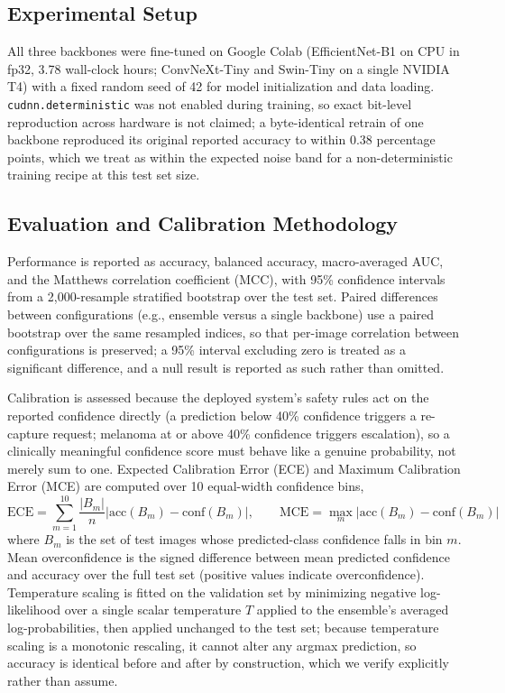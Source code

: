 \documentclass[VANCOUVER,twocolumn]{USG}
\begin{document}
\subsection{Experimental Setup}

All three backbones were fine-tuned on Google Colab (EfficientNet-B1 on CPU
in fp32, 3.78 wall-clock hours; ConvNeXt-Tiny and Swin-Tiny on a single
NVIDIA T4) with a fixed random seed of 42 for model initialization and
data loading. \texttt{cudnn.deterministic} was not enabled during
training, so exact bit-level reproduction across hardware is not claimed;
a byte-identical retrain of one backbone reproduced its original reported
accuracy to within 0.38 percentage points, which we treat as within the
expected noise band for a non-deterministic training recipe at this test
set size.

\subsection{Evaluation and Calibration Methodology}

Performance is reported as accuracy, balanced accuracy, macro-averaged
AUC, and the Matthews correlation coefficient (MCC), with 95\% confidence
intervals from a 2,000-resample stratified bootstrap over the test set.
Paired differences between configurations (e.g., ensemble versus a single
backbone) use a paired bootstrap over the same resampled indices, so that
per-image correlation between configurations is preserved; a 95\% interval
excluding zero is treated as a significant difference, and a null result
is reported as such rather than omitted.

Calibration is assessed because the deployed system's safety rules act on
the reported confidence directly (a prediction below 40\% confidence
triggers a re-capture request; melanoma at or above 40\% confidence
triggers escalation), so a clinically meaningful confidence score must
behave like a genuine probability, not merely sum to one. Expected
Calibration Error (ECE) and Maximum Calibration Error (MCE) are computed
over 10 equal-width confidence bins,
\begin{equation}
\mathrm{ECE} = \sum_{m=1}^{10} \frac{|B_m|}{n} \left| \mathrm{acc}(B_m) - \mathrm{conf}(B_m) \right|,
\qquad \mathrm{MCE} = \max_m \left| \mathrm{acc}(B_m) - \mathrm{conf}(B_m) \right|
\end{equation}
where $B_m$ is the set of test images whose predicted-class confidence
falls in bin $m$. Mean overconfidence is the signed difference between
mean predicted confidence and accuracy over the full test set (positive
values indicate overconfidence). Temperature scaling is fitted on the
validation set by minimizing negative log-likelihood over a single scalar
temperature $T$ applied to the ensemble's averaged log-probabilities, then
applied unchanged to the test set; because temperature scaling is a
monotonic rescaling, it cannot alter any argmax prediction, so accuracy is
identical before and after by construction, which we verify explicitly
rather than assume.
\end{document}
